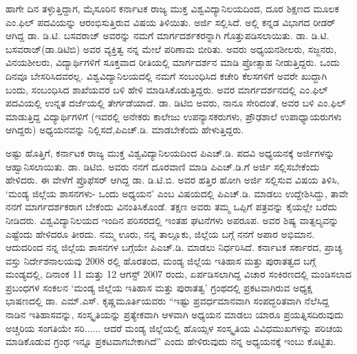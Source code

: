 ಹಾಗೇ ದಿನ ತಳ್ಳುತ್ತಿದ್ದಾಗ, ಮೈಸೂರಿನ ಕರ್ನಾಟಕ ರಾಜ್ಯ ಮುಕ್ತ ವಿಶ್ವವಿದ್ಯಾನಿಲಯದಿಂದ, ದೂರ ಶಿಕ್ಷಣದ ಮೂಲಕ ಎಂ.ಫಿಲ್​ ಪದವಿಯನ್ನು ಆರಂಭಿಸುತ್ತಿರುವ ವಿಷಯ ತಿಳಿಯಿತು. ಅರ್ಜಿ ಸಲ್ಲಿಸಿದೆ. ಅಲ್ಲಿ ಕನ್ನಡ ವಿಭಾಗದ ರೀಡರ್​ ಆಗಿದ್ದ ಡಾ. ಡಿ.ಟಿ. ಬಸವರಾಜ್​ ಅವರನ್ನು ನಮಗೆ ಮಾರ್ಗದರ್ಶಕರನ್ನಾಗಿ ಗೊತ್ತುಪಡಿಸಲಾಯಿತು. ಡಾ. ಡಿ.ಟಿ. ಬಸವರಾಜ್​(ಡಾ.ಡಿಟಿಬಿ) ಅವರ ವ್ಯಕ್ತಿತ್ವ ನನ್ನ ಮೇಲೆ ಪರಿಣಾಮ ಬೀರಿತು. ಅವರು ಅಧ್ಯಯನಶೀಲರು, ಸಜ್ಜನರು, ವಿನಯಶೀಲರು, ವಿದ್ಯಾರ್ಥಿಗಳಿಗೆ ಸೂಕ್ತವಾದ ರೀತಿಯಲ್ಲಿ ಮಾರ್ಗದರ್ಶನ ಮಾಡಿ ಪ್ರೋತ್ಸಾಹ ನೀಡುತ್ತಿದ್ದರು. ಒಂದು ದಿನವೂ ಬೇಸರಿಸಿದವರಲ್ಲ. ವಿಶ್ವವಿದ್ಯಾನಿಲಯದಲ್ಲಿ ನಮಗೆ ಸಂಬಂಧಿಸಿದ ಕಚೇರಿ ಕೆಲಸಗಳಿಗೆ ಅವರೇ ಖುದ್ದಾಗಿ ಬಂದು, ಸಂಬಂಧಿಸಿದ ಶಾಖೆಯವರ ಬಳಿ ಹೇಳಿ ಮಾಡಿಸಿಕೊಡುತ್ತಿದ್ದರು. ಅವರ ಮಾರ್ಗದರ್ಶನದಲ್ಲಿ ಎಂ.ಫಿಲ್​ ಪದವಿಯಲ್ಲಿ ಉನ್ನತ ದರ್ಜೆಯಲ್ಲಿ ತೇರ್ಗಡೆಯಾದೆ. ಡಾ. ಡಿಟಿಬಿ ಅವರು, ನಾನೂ ಸೇರಿದಂತೆ, ಅವರ ಬಳಿ ಎಂ.ಫಿಲ್​ ಮಾಡುತ್ತಿದ್ದ ವಿದ್ಯಾರ್ಥಿಗಳಿಗೆ (ಇವರಲ್ಲಿ ಅನೇಕರು ಕಾಲೇಜು ಉಪನ್ಯಾಸಕರುಗಳು, ಪ್ರೌಢಶಾಲೆ ಉಪಾಧ್ಯಾಯರುಗಳು ಆಗಿದ್ದರು) ಅಧ್ಯಯನವನ್ನು ನಿಲ್ಲಿಸದೆ,\break ಪಿಎಚ್​.ಡಿ. ಮಾಡಬೇಕೆಂದು ಹೇಳುತ್ತಿದ್ದರು.

ಅಷ್ಟು ಹೊತ್ತಿಗೆ, ಕರ್ನಾಟಕ ರಾಜ್ಯ ಮುಕ್ತ ವಿಶ್ವವಿದ್ಯಾನಿಲಯದಿಂದ ಪಿಎಚ್​.ಡಿ. ಪದವಿ ಅಧ್ಯಯನಕ್ಕೆ ಅರ್ಜಿಗಳನ್ನು ಆಹ್ವಾನಿಸಲಾಯಿತು. ಡಾ. ಡಿಟಿಬಿ. ಅವರು ನನಗೆ ದೂರವಾಣಿ ಮಾಡಿ ಪಿಎಚ್​.ಡಿ.ಗೆ ಅರ್ಜಿ ಸಲ್ಲಿಸಬೇಕೆಂದು ಹೇಳಿದರು. ಈ ವೇಳೆಗೆ ಪ್ರೊಫೆಸರ್​ ಆಗಿದ್ದ ಡಾ. ಡಿ.ಟಿ.ಬಿ. ಅವರ ಹತ್ತಿರ ಹೋಗಿ ಅರ್ಜಿ ಸಲ್ಲಿಸುವ ವಿಷಯ ತಿಳಿಸಿ, ‘ಮಂಡ್ಯ ಜಿಲ್ಲೆಯ ಶಾಸನಗಳು- ಒಂದು ಅಧ್ಯಯನ’ ಎಂಬ ವಿಷಯದಲ್ಲಿ ಪಿಎಚ್​.ಡಿ. ಮಾಡಲು ಉದ್ದೇಶಿಸಿದ್ದು, ತಾವೇ ನನಗೆ ಮಾರ್ಗದರ್ಶಕರಾಗ ಬೇಕೆಂದು ವಿನಂತಿಸಿಕೊಂಡೆ. ತಕ್ಷಣ ಅವರು ತಮ್ಮ ಒಪ್ಪಿಗೆ ಪತ್ರವನ್ನು ಕೈಯಲ್ಲೇ ಬರೆದು ನೀಡಿದರು. ವಿಶ್ವವಿದ್ಯಾನಿಲಯದ ಇಂದಿನ ಪರಿಸರದಲ್ಲಿ ಇಂತಹ ಘಟನೆಗಳು ಅಪರೂಪ. ಅವರ ಶಿಷ್ಯ ವಾತ್ಸಲ್ಯವನ್ನು ಎಷ್ಟೆಂದು ಹೇಳಿದರೂ ತೀರದು. ನಮ್ಮ ಊರು, ನನ್ನ ತಾಲ್ಲೂಕು, ಜಿಲ್ಲೆಯ ಬಗ್ಗೆ ನನಗೆ ಅಪಾರ ಅಭಿಮಾನ. ಆದುದರಿಂದ ನನ್ನ ಜಿಲ್ಲೆಯ ಶಾಸನಗಳ ಬಗ್ಗೆಯೇ ಪಿಎಚ್​.ಡಿ. ಮಾಡಲು ನಿರ್ಧರಿಸಿದೆ. ಕರ್ನಾಟಕ ಸರ್ಕಾರದ, ಪ್ರಾಚ್ಯ ವಸ್ತು ನಿರ್ದೇಶನಾಲಯವು 2008 ರಲ್ಲಿ ಹೊರತಂದ, ಮಂಡ್ಯ ಜಿಲ್ಲೆಯ ಇತಿಹಾಸ ಮತ್ತು ಪುರಾತತ್ವದ ಬಗ್ಗೆ ಮಂಡ್ಯದಲ್ಲಿ, ದಿನಾಂಕ 11 ಮತ್ತು 12 ಆಗಸ್ಟ್​ 2007 ರಂದು, ಏರ್ಪಡಿಸಲಾಗಿದ್ದ ವಿಚಾರ ಸಂಕಿರಣದಲ್ಲಿ ಮಂಡಿಸಲಾದ ಪ್ರಬಂಧಗಳ ಸಂಕಲನ ‘ಮಂಡ್ಯ ಜಿಲ್ಲೆಯ ಇತಿಹಾಸ ಮತ್ತು ಪುರಾತತ್ವ’ ಗ್ರಂಥದಲ್ಲಿ ಪ್ರಕಟವಾಗಿರುವ ಅಧ್ಯಕ್ಷ ಭಾಷಣದಲ್ಲಿ ಡಾ. ಎಮ್.ಎಸ್​. ಕೃಷ್ಣಮೂರ್ತಿಯವರು “ಇಷ್ಟು ಪ್ರವರ್ಧಮಾನವಾಗಿ ಸಂಪದ್ಭರಿತವಾಗಿ ನೆಲೆಸಿದ್ದ ನಾಡಿನ ಇತಿಹಾಸವನ್ನು, ಸಂಸ್ಕೃತಿಯನ್ನು ಪ್ರತ್ಯೇಕವಾಗಿ ಆಳವಾಗಿ ಅಧ್ಯಯನ ಮಾಡಲು ಯಾರೂ ಪ್ರಯತ್ನಿಸದಿರುವುದು ಅಚ್ಚರಿಯ ಸಂಗತಿಯೇ ಸರಿ...... ಆದರೆ ಮಂಡ್ಯ ಜಿಲ್ಲೆಯಲ್ಲಿ ಹೊಯ್ಸಳ ಸಂಸ್ಕೃತಿಯ ವಿವಿಧಮುಖಗಳನ್ನು ಪರಿಚಯ ಮಾಡಿಕೊಡುವ ಗ್ರಂಥ ಇನ್ನೂ ಪ್ರಕಟವಾಗಬೇಕಾಗಿದೆ” ಎಂದು ಹೇಳಿರುವುದು ನನ್ನ ಅಧ್ಯಯನಕ್ಕೆ ಇಂಬು ಕೊಟ್ಟಿತು. 

